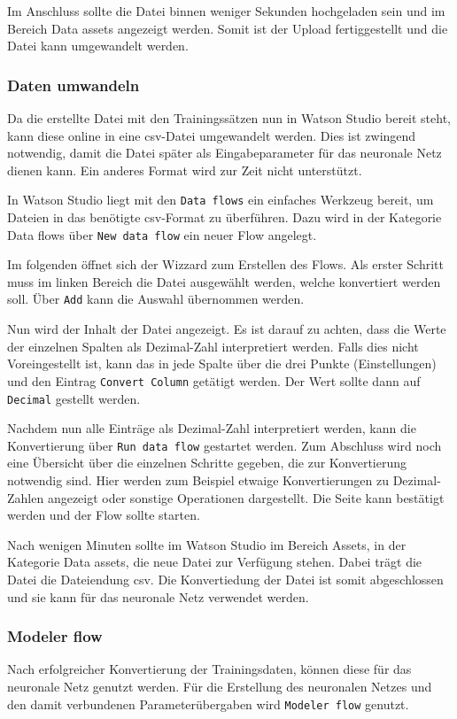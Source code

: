 Im Anschluss sollte die Datei binnen weniger Sekunden hochgeladen sein und im Bereich Data assets angezeigt werden. Somit
ist der Upload fertiggestellt und die Datei kann umgewandelt werden.

\subsubsection{Daten umwandeln}
Da die erstellte Datei mit den Trainingssätzen nun in Watson Studio bereit steht, kann diese online in eine csv-Datei
umgewandelt werden. Dies ist zwingend notwendig, damit die Datei später als Eingabeparameter für das neuronale Netz dienen
kann. Ein anderes Format wird zur Zeit nicht unterstützt.

In Watson Studio liegt mit den \texttt{Data flows} ein einfaches Werkzeug bereit, um Dateien in das benötigte csv-Format
zu überführen. Dazu wird in der Kategorie Data flows über \texttt{New data flow} ein neuer Flow angelegt.

Im folgenden öffnet sich der Wizzard zum Erstellen des Flows. Als erster Schritt muss im linken Bereich die Datei
ausgewählt werden, welche konvertiert werden soll. Über \texttt{Add} kann die Auswahl übernommen werden.

Nun wird der Inhalt der Datei angezeigt. Es ist darauf zu achten, dass die Werte der einzelnen Spalten als Dezimal-Zahl
interpretiert werden. Falls dies nicht Voreingestellt ist, kann das in jede Spalte über die drei Punkte (Einstellungen)
und den Eintrag \texttt{Convert Column} getätigt werden. Der Wert sollte dann auf \texttt{Decimal} gestellt werden.

Nachdem nun alle Einträge als Dezimal-Zahl interpretiert werden, kann die Konvertierung über \texttt{Run data flow}
gestartet werden. Zum Abschluss wird noch eine Übersicht über die einzelnen Schritte gegeben, die zur Konvertierung
notwendig sind. Hier werden zum Beispiel etwaige Konvertierungen zu Dezimal-Zahlen angezeigt oder sonstige Operationen
dargestellt. Die Seite kann bestätigt werden und der Flow sollte starten.

Nach wenigen Minuten sollte im Watson Studio im Bereich Assets, in der Kategorie Data assets, die neue Datei zur Verfügung
stehen. Dabei trägt die Datei die Dateiendung csv. Die Konvertiedung der Datei ist somit abgeschlossen und sie kann für
das neuronale Netz verwendet werden.

\subsubsection{Modeler flow}
Nach erfolgreicher Konvertierung der Trainingsdaten, können diese für das neuronale Netz genutzt werden. Für die
Erstellung des neuronalen Netzes und den damit verbundenen Parameterübergaben wird \texttt{Modeler flow} genutzt.

